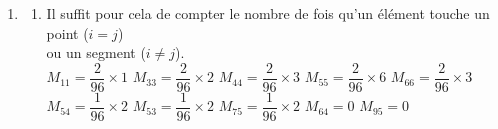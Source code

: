 \documentclass[12pt,a4paper]{article}
\begin{document}
\begin{enumerate}
	Calculons $\displaystyle\begin{aligned}[t]
		\int_K \lambda_1^{k_1}\lambda_3^{k_2} &= \abs{\det JF_K}\int_0^1\int_0^{1-x_1}x_1^{k_1}(1-x_1-x_2)^{k_2}\dx_2\dx_1\\
		&=2S_K\int_0^1x_1^{k_1}\int_0^{1-x_1}(1-x_1-x_2)^{k_2}\dx_2\dx_1\\
		&=2S_K\int_0^1x_1^{k_1}\left[\dfrac{-1}{k_2+1}(1-x_1-x_2)^{k_2+1}\right]_0^{1-x_1}\dx_2\dx_1\\
		&=\dfrac{2S_K}{k_2+1}\int_0^1 x_1^{k_1}(1-x_1)^{k_2+1}\dx_1 &= \int_K\lambda_1^{k_1}\lambda_2^{k_2}
	\end{aligned}$\\
	
	De même $\displaystyle\int_K\lambda_2^{k_1}\lambda_3^{k_2} = 2S_K\int_0^1\int_0^{1-x_2}x_2^{k_1}(1-x_1-x_2)^{k_2}\dx_1\dx_2 = \int_K \lambda_1^{k_1}\lambda_2^{k_2}$.\\
	
	Or $M_{11}^K = 2S_K\dfrac{0!2!}{4!} = \dfrac{S_K}{3!}$, or $S_K = \dfrac{0.5\times0.5}{2} = \dfrac18$.\\
	Ainsi $M_{11}^K = \dfrac{2}{96}$ et $M_{12}^K = 2S_K\dfrac{1!1!}{4!} = \dfrac1{96}$. Finalement :
	
	\[M^K = \dfrac1{96}\begin{bmatrix}
		2 & 1 & 1 \\
		1 & 2 & 1 \\ 
		1 & 1 & 2
	\end{bmatrix}\]
	,
	\item \begin{enumerate}
		\item Il suffit pour cela de compter le nombre de fois qu'un élément touche un point ($i=j$)\\ ou un segment ($i\not=j$).\\
			  $M_{11} = \dfrac2{96} \times 1$ \hspace{.5cm} $M_{33} = \dfrac2{96} \times 2$ \hspace{.5cm} $M_{44} = \dfrac2{96} \times 3$ \hspace{.5cm} $M_{55} = \dfrac{2}{96}\times6$ \hspace{.5cm} $M_{66} = \dfrac2{96}\times 3$\\
			  $M_{54} = \dfrac1{96} \times 2$ \hspace{.5cm} $M_{53} = \dfrac1{96}\times 2$ \hspace{.5cm} $M_{75} = \dfrac1{96}\times 2$ \hspace{.5cm} $M_{64} = 0$ \hspace{.5cm} $M_{95} = 0$
			  

\end{enumerate}
\end{enumerate}
\end{document}
